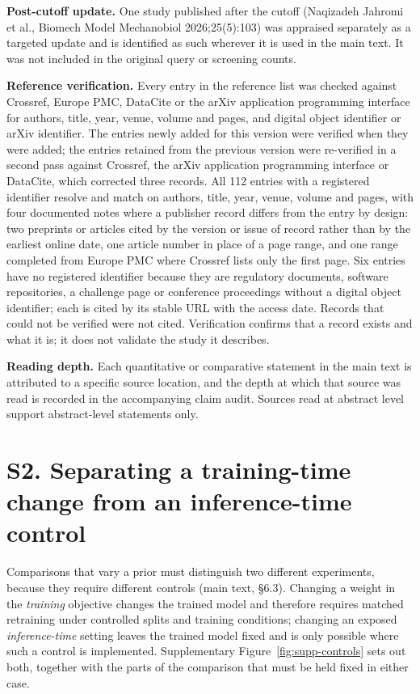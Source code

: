 \documentclass[10pt,a4paper]{article}
\begin{document}
\textbf{Post-cutoff update.} One study published after the cutoff (Naqizadeh Jahromi et al., Biomech
Model Mechanobiol 2026;25(5):103) was appraised separately as a targeted update and is identified as
such wherever it is used in the main text. It was not included in the original query or screening
counts.

\textbf{Reference verification.} Every entry in the reference list was checked against Crossref,
Europe PMC, DataCite or the arXiv application programming interface for authors, title, year, venue,
volume and pages, and digital object identifier or arXiv identifier. The entries newly added for
this version were verified when they were added; the entries retained from the previous version were
re-verified in a second pass against Crossref, the arXiv application programming interface or
DataCite, which corrected three records. All 112 entries with a registered identifier resolve and
match on authors, title, year, venue, volume and pages, with four documented notes where a publisher
record differs from the entry by design: two preprints or articles cited by the version or issue of
record rather than by the earliest online date, one article number in place of a page range, and one
range completed from Europe PMC where Crossref lists only the first page. Six entries have no
registered identifier because they are regulatory documents, software repositories, a challenge page
or conference proceedings without a digital object identifier; each is cited by its stable URL with
the access date. Records that could not be verified were not cited. Verification confirms that a record
exists and what it is; it does not validate the study it describes.

\textbf{Reading depth.} Each quantitative or comparative statement in the main text is attributed to
a specific source location, and the depth at which that source was read is recorded in the
accompanying claim audit. Sources read at abstract level support abstract-level statements only.

\section*{S2. Separating a training-time change from an inference-time control}

Comparisons that vary a prior must distinguish two different experiments, because they require
different controls (main text, \S6.3). Changing a weight in the \emph{training}
objective changes the trained model and therefore requires matched retraining under controlled
splits and training conditions; changing an exposed \emph{inference-time} setting leaves the trained
model fixed and is only possible where such a control is implemented. Supplementary
Figure~\ref{fig:supp-controls} sets out both, together with the parts of the comparison that must be
held fixed in either case.
\end{document}
